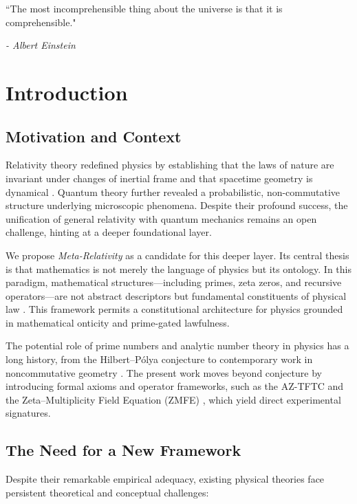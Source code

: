 \documentclass[12]{amsart}
\theoremstyle{plain}
\begin{document}
\vspace{2em}

\epigraph{“The most incomprehensible thing about the universe is that it is comprehensible."} 
{\textit{- Albert Einstein}}

\vspace{1em}


\section{Introduction}

\subsection{Motivation and Context}

Relativity theory redefined physics by establishing that the laws of nature are invariant under changes of inertial frame and that spacetime geometry is dynamical \cite{einstein1905}. Quantum theory further revealed a probabilistic, non-commutative structure underlying microscopic phenomena. Despite their profound success, the unification of general relativity with quantum mechanics remains an open challenge, hinting at a deeper foundational layer.

We propose \emph{Meta-Relativity} as a candidate for this deeper layer. Its central thesis is that mathematics is not merely the language of physics but its ontology. In this paradigm, mathematical structures---including primes, zeta zeros, and recursive operators---are not abstract descriptors but fundamental constituents of physical law \cite{MRPConstitution, ZMAAxiom}. This framework permits a constitutional architecture for physics grounded in mathematical onticity and prime-gated lawfulness.

The potential role of prime numbers and analytic number theory in physics has a long history, from the Hilbert--Pólya conjecture to contemporary work in noncommutative geometry \cite{connes1999}. The present work moves beyond conjecture by introducing formal axioms and operator frameworks, such as the AZ-TFTC \cite{AZTFTCPaper} and the Zeta--Multiplicity Field Equation (ZMFE) \cite{ZMFEFormulation}, which yield direct experimental signatures.

\subsection{The Need for a New Framework}

Despite their remarkable empirical adequacy, existing physical theories face persistent theoretical and conceptual challenges:
\end{document}
